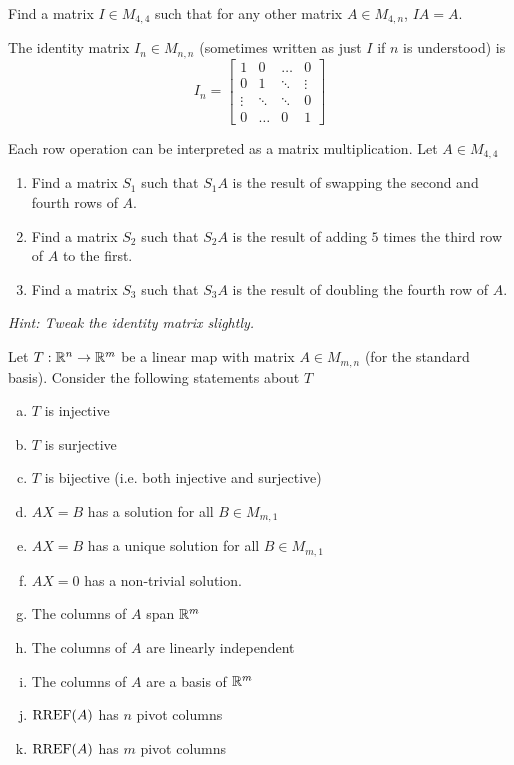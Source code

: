 
\begin{applicationActivities}{2}{22}

\begin{activity}{5}
Find a matrix $I \in M_{4,4}$ such that for any other matrix $A \in M_{4,n}$, $IA=A$.
\end{activity}

\begin{definition}
The identity matrix $I_n \in M_{n,n}$ (sometimes written as just $I$ if $n$ is understood) is $$I_n = \begin{bmatrix} 1 & 0  & \hdots & 0 \\ 0 & 1 & \ddots & \vdots  \\ \vdots & \ddots & \ddots & 0 \\ 0 & \hdots & 0 & 1 \end{bmatrix}$$
\end{definition}

\begin{activity}{15}
Each row operation can be interpreted as a matrix multiplication.  Let $A \in M_{4,4}$
\begin{enumerate}[1)]
\item Find a matrix $S_1$ such that $S_1A$ is the result of swapping the second and fourth rows of $A$.
\item Find a matrix $S_2$ such that $S_2A$ is the result of adding $5$ times the third row of $A$ to the first.
\item Find a matrix $S_3$ such that $S_3A$ is the result of doubling the fourth row of $A$.
\end{enumerate}

{\em Hint:  Tweak the identity matrix slightly.}
\end{activity}


\begin{activity}{15}
Let $T: \mathbb{R}^n \rightarrow \mathbb{R}^m$ be a linear map with matrix $A \in M_{m,n}$ (for the standard basis).  Consider the following statements about $T$
\begin{enumerate}[(a)]
\item $T$ is injective
\item $T$ is surjective
\item $T$ is bijective (i.e. both injective and surjective)
\item $AX=B$ has a solution for all $B \in M_{m,1}$
\item $AX=B$ has a unique solution for all $B \in M_{m,1}$
\item $AX=0$ has a non-trivial solution.
\item The columns of $A$ span $\mathbb{R}^m$
\item The columns of $A$ are linearly independent
\item The columns of $A$ are a basis of $\mathbb{R}^m$
\item $\operatorname{RREF}(A)$ has $n$ pivot columns
\item $\operatorname{RREF}(A)$ has $m$ pivot columns
\end{enumerate}


\end{activity}
\end{applicationActivities}
